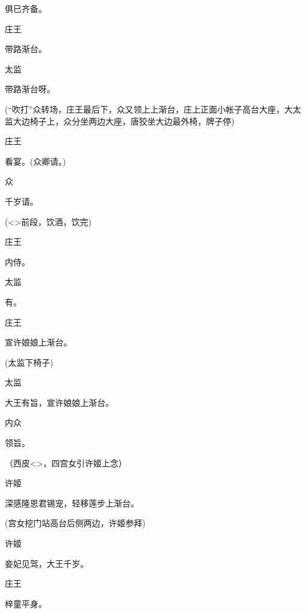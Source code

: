 {俱已齐备。

庄王\hspace{30pt}~

带路渐台。

太监\hspace{30pt}~

带路渐台呀。

\vspace{3pt}{\centerline{{[}{{[}连场第二场}{]}}}\vspace{5pt}

(``{吹打}''众转场，庄王最后下，众又领上上渐台，庄上正面小帐子高台大座，大太监大边椅子上，众分坐两边大座，唐狡坐大边最外椅，牌子停)

庄王\hspace{30pt}~

看宴。(众卿请。)

众\hspace{40pt}~

千岁请。

(\textless{}\!\textgreater{}前段，饮酒，饮完)

庄王\hspace{30pt}~

内侍。

太监\hspace{30pt}~

有。

庄王\hspace{30pt}~

宣许娘娘上渐台。

(太监下椅子)

太监\hspace{30pt}~

大王有旨，宣许娘娘上渐台。

内众\hspace{30pt}~

领旨。

（西皮\textless{}\!\textgreater{}，四宫女引许姬上念）

许姬\hspace{30pt}~

深感隆恩君锡宠，轻移莲步上渐台。

(宫女挖门站高台后侧两边，许姬参拜)

许姬\hspace{30pt}~

妾妃见驾，大王千岁。

庄王\hspace{30pt}~

梓童平身。

}
